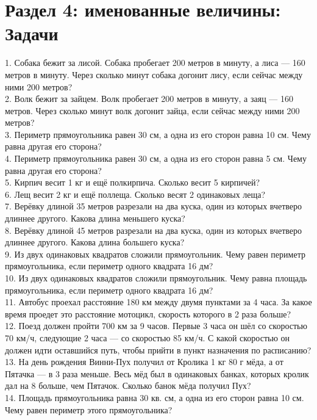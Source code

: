 \section{Раздел 4: именованные величины: Задачи}
1. Собака бежит за лисой. Собака пробегает 200 метров в минуту, а лиса --- 160 метров в минуту. Через сколько минут собака догонит лису, если сейчас между ними 200 метров?\\
2. Волк бежит за зайцем. Волк пробегает 200 метров в минуту, а заяц --- 160 метров. Через сколько минут волк догонит зайца, если сейчас между ними 200 метров?\\
3. Периметр прямоугольника равен 30 см, а одна из его сторон равна 10 см. Чему равна другая его сторона?\\
4. Периметр прямоугольника равен 30 см, а одна из его сторон равна 5 см. Чему равна другая его сторона?\\
5. Кирпич весит 1 кг и ещё полкирпича. Сколько весит 5 кирпичей?\\
6. Лещ весит 2 кг и ещё поллеща. Сколько весят 2 одинаковых леща?\\
7. Верёвку длиной 35 метров разрезали на два куска, один из которых вчетверо длиннее другого. Какова длина меньшего куска?\\
8. Верёвку длиной 45 метров разрезали на два куска, один из которых вчетверо длиннее другого. Какова длина большего куска?\\
9. Из двух одинаковых квадратов сложили прямоугольник. Чему равен периметр прямоугольника, если периметр одного квадрата 16 дм?\\
10. Из двух одинаковых квадратов сложили прямоугольник. Чему равна площадь прямоугольника, если периметр одного квадрата 16 дм?\\
11. Автобус проехал расстояние 180 км между двумя пунктами за 4 часа. За какое время проедет это расстояние мотоцикл, скорость которого в 2 раза больше?\\
12. Поезд должен пройти 700 км за 9 часов. Первые 3 часа он шёл со скоростью 70 км/ч, следующие 2 часа --- со скоростью 85 км/ч. С какой скоростью он должен идти оставшийся путь, чтобы прийти в пункт назначения по расписанию?\\
13. На день рождения Винни-Пух получил от Кролика 1 кг 80 г мёда, а от Пятачка --- в 3 раза меньше. Весь мёд был в одинаковых банках, которых кролик дал на 8 больше, чем Пятачок. Сколько банок мёда получил Пух?\\
14. Площадь прямоугольника равна 30 кв. см, а одна из его сторон равна 10 см. Чему равен периметр этого прямоугольника?\\
